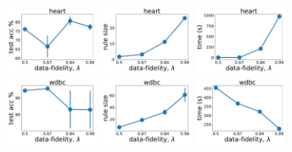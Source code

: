 \begin{figure}[t]
	\centering
	
	\subfloat
	{\includegraphics[width=0.27\textwidth]{figures/interpretability/relaxed-cnf/heart_test_accuracy_vary_lambda.pdf}}
	\subfloat
	{\includegraphics[width=0.27\textwidth]{figures/interpretability/relaxed-cnf/heart_rule_size_vary_lambda.pdf}}
	\subfloat
	{\includegraphics[width=0.27\textwidth]{figures/interpretability/relaxed-cnf/heart_time_vary_lambda.pdf}} 
	\\

	\subfloat
	{\includegraphics[width=0.27\textwidth]{figures/interpretability/relaxed-cnf/wdbc_test_accuracy_vary_lambda.pdf}}
	\subfloat
	{\includegraphics[width=0.27\textwidth]{figures/interpretability/relaxed-cnf/wdbc_rule_size_vary_lambda.pdf}}
	\subfloat
	{\includegraphics[width=0.27\textwidth]{figures/interpretability/relaxed-cnf/wdbc_time_vary_lambda.pdf}} 
	\\
	

\end{figure}
